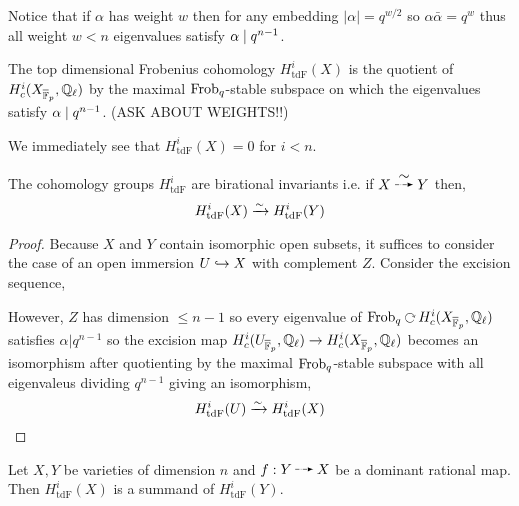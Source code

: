 \documentclass[12pt]{article}
\begin{document}
\begin{rmk}
Notice that if $\alpha$ has weight $w$ then for any embedding $|\alpha| = q^{w/2}$ so $\alpha \bar{\alpha} = q^w$ thus all weight $w < n$ eigenvalues satisfy $\alpha \mid q^{n-1}$.
\end{rmk}

\newcommand{\tdF}{\mathrm{tdF}}

\begin{defn}
The top dimensional Frobenius cohomology $H_{\tdF}^i(X)$ is the quotient of $H^i_c(X_{\overline{\mathbb{F}}_p}, \mathbb{Q}_\ell)$ by the maximal $\mathrm{Frob}_q$-stable subspace on which the eigenvalues satisfy $\alpha \mid q^{n-1}$.
(ASK ABOUT WEIGHTS!!)
\end{defn}

\begin{rmk}
We immediately see that $H^i_{\tdF}(X) = 0$ for $i < n$.
\end{rmk}

\begin{prop}
The cohomology groups $H^i_{\tdF}$ are birational invariants i.e. if $X \birat Y$ then,
\[ H^i_{\tdF}(X) \iso H^i_{\tdF}(Y) \]
\end{prop}

\begin{proof}
Because $X$ and $Y$ contain isomorphic open subsets, it suffices to consider the case of an open immersion $U \hookrightarrow X$ with complement $Z$. Consider the excision sequence,
\begin{center}
\end{center}
However, $Z$ has dimension $\le n - 1$ so every eigenvalue of $\Frob_q \acts H^i_c(X_{\barF_p}, \Q_\ell)$ satisfies $\alpha | q^{n-1}$ so the excision map $H^i_c(U_{\overline{\mathbb{F}}_p}, \mathbb{Q}_\ell) \to H^i_c(X_{\overline{\mathbb{F}}_p}, \mathbb{Q}_\ell)$ becomes an isomorphism after quotienting by the maximal $\mathrm{Frob}_q$-stable subspace with all eigenvaleus dividing $q^{n-1}$ giving an isomorphism,
\[ H^i_{\tdF}(U) \iso H^i_{\tdF}(X) \]
\end{proof}

\begin{prop}
Let $X, Y$ be varieties of dimension $n$ and $f : Y \rat X$ be a dominant rational map. Then $H^i_{\tdF}(X)$ is a summand of $H^i_{\tdF}(Y)$.
\end{prop}
\end{document}
